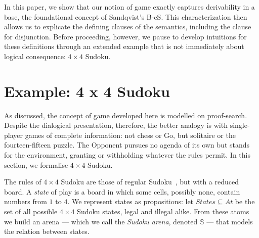 \documentclass{lipics-v2021}
\newcommand{\arena}[1]{\mathbb{#1}}                     %
\newcommand{\At}{\mathit{At}}                           %
\begin{document}
In this paper, we show that our notion of game exactly captures derivability in a base, the foundational concept of Sandqvist's B-eS. This characterization then allows us to explicate the defining clauses of the semantics, including the clause for disjunction. Before proceeding, however, we pause to develop intuitions for these definitions through an extended example that is not immediately about logical consequence: $4 \times 4$ Sudoku.
\section{Example: 4 x 4 Sudoku}
\label{sec:sudoku}
 
As discussed, the concept of game developed here is modelled on proof-search.
Despite the dialogical presentation, therefore, the better analogy is with
single-player games of complete information: not chess or Go, but
solitaire or the fourteen-fifteen puzzle. The Opponent pursues no agenda of its own but
stands for the environment, granting or withholding whatever the rules
permit. In this section, we formalise $4 \times 4$ Sudoku.
 
The rules of $4 \times 4$ Sudoku are those of regular Sudoku~\cite{FelgenhauerJarvis2006}, but with a reduced board. A
\emph{state} of play is a board in which some cells, possibly none, contain
numbers from $1$ to $4$. We represent states as propositions: let
$\mathit{States} \subseteq \At$ be the set of all possible $4 \times 4$ Sudoku
states, legal and illegal alike. From
these atoms we build an arena --- which we call the \emph{Sudoku arena},
denoted $\arena{S}$ --- that models the relation between states.
 
\end{document}
